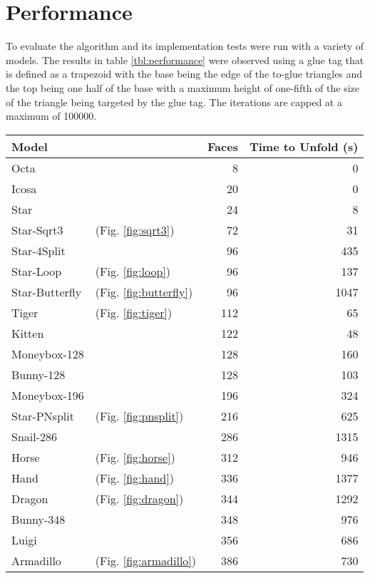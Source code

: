 \documentclass[draft,final]{vutinfth} %
\begin{document}

\section{Performance}
\label{sec:performance}

To evaluate the algorithm and its implementation tests were run with a variety of models. The results in table \ref{tbl:performance} were observed using a glue tag that is defined as a trapezoid with the base being the edge of the to-glue triangles and the top being one half of the base with a maximum height of one-fifth of the size of the triangle being targeted by the glue tag. The iterations are capped at a maximum of 100000.

\begingroup
\centering
\begin{tabular}{|ll|r|r|}
\hline
Model & & Faces & Time to Unfold (s) \\
\hline
Octa & & 8 & 0 \\
Icosa & & 20 & 0 \\
Star & & 24 & 8 \\
Star-Sqrt3 & (Fig. \ref{fig:sqrt3}) & 72 & 31 \\
Star-4Split & & 96 & 435 \\
Star-Loop & (Fig. \ref{fig:loop}) & 96 & 137 \\
Star-Butterfly & (Fig. \ref{fig:butterfly}) & 96 & 1047 \\
Tiger & (Fig. \ref{fig:tiger}) & 112 & 65 \\
Kitten & & 122 & 48 \\
Moneybox-128 & & 128 & 160 \\
Bunny-128 & & 128 & 103 \\
Moneybox-196 & & 196 & 324 \\
Star-PNsplit & (Fig. \ref{fig:pnsplit}) & 216 & 625 \\
Snail-286 & & 286 & 1315 \\
Horse & (Fig. \ref{fig:horse}) & 312 & 946 \\
Hand & (Fig. \ref{fig:hand}) & 336 & 1377 \\
Dragon & (Fig. \ref{fig:dragon}) & 344 & 1292 \\
Bunny-348 & & 348 & 976 \\
Luigi & & 356 & 686 \\
Armadillo & (Fig. \ref{fig:armadillo}) & 386 & 730 \\

\end{tabular}
\end{document}
